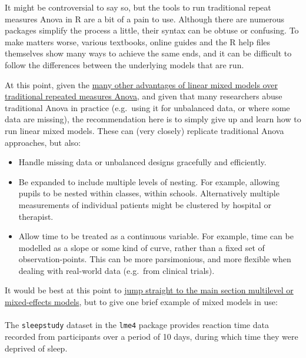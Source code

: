 \documentclass[]{article}
\let\oldparagraph\paragraph
\renewcommand{\paragraph}[1]{\oldparagraph{#1}\mbox{}}
\begin{document}
It might be controversial to say so, but the tools to run traditional repeat
measures Anova in R are a bit of a pain to use. Although there are numerous
packages simplify the process a little, their syntax can be obtuse or confusing.
To make matters worse, various textbooks, online guides and the R help files
themselves show many ways to achieve the same ends, and it can be difficult to
follow the differences between the underlying models that are run.

At this point, given the
\href{http://jamanetwork.com/journals/jamapsychiatry/article-abstract/481967}{many other advantages of linear mixed models over traditional repeated measures Anova},
and given that many researchers abuse traditional Anova in practice (e.g.~using
it for unbalanced data, or where some data are missing), the recommendation here
is to simply give up and learn how to run linear mixed models. These can (very
closely) replicate traditional Anova approaches, but also:

\begin{itemize}
\item
  Handle missing data or unbalanced designs gracefully and efficiently.
\item
  Be expanded to include multiple levels of nesting. For example, allowing
  pupils to be nested within classes, within schools. Alternatively multiple
  measurements of individual patients might be clustered by hospital or
  therapist.
\item
  Allow time to be treated as a continuous variable. For example, time can be
  modelled as a slope or some kind of curve, rather than a fixed set of
  observation-points. This can be more parsimonious, and more flexible when
  dealing with real-world data (e.g.~from clinical trials).
\end{itemize}

It would be best at this point to
\protect\hyperlink{multilevel-models}{jump straight to the main section multilevel or mixed-effects models},
but to give one brief example of mixed models in use:

\hypertarget{sleepstudy-rmanova}{%
\paragraph{}\label{sleepstudy-rmanova}}

The \texttt{sleepstudy} dataset in the \texttt{lme4} package provides reaction time data
recorded from participants over a period of 10 days, during which time they were
deprived of sleep.
\end{document}
